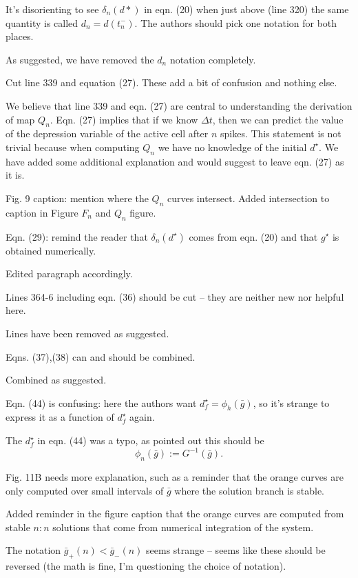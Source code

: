 \documentclass{ar2rc}
\begin{document}
\RC
It’s disorienting to see $\delta_n(d*)$ in eqn. (20) when just above (line 320) the same quantity is called $d_n = d(t_n^ -)$. The authors should pick one notation for both places.

\AR
As suggested, we have removed the $d_ n$ notation completely.

\RC
Cut line 339 and equation (27). These add a bit of confusion and nothing else.

\AR
We believe that line 339 and eqn. (27) are central to understanding the derivation of map $Q_{n}$. Eqn. (27) implies that if we know $\Delta t$, then we can predict the value of the depression variable of the active cell after $n$ spikes. This statement is not trivial because when computing $Q_{n}$ we have no knowledge of the initial $d^{\star}$. We have added some additional explanation and would suggest to leave eqn. (27) as it is.

\RC
Fig. 9 caption: mention where the $Q_n$ curves intersect.
\AR
Added intersection to caption in Figure $F_{n}$ and $Q_{n}$ figure.

\RC
Eqn. (29): remind the reader that $\delta_n(d^ \star)$ comes from eqn. (20) and that $g^{\star}$ is obtained numerically.

\AR
Edited paragraph accordingly.

\RC
Lines 364-6 including eqn. (36) should be cut – they are neither new nor helpful here.

\AR
Lines have been removed as suggested.

\RC
Eqns. (37),(38) can and should be combined.

\AR
Combined as suggested.

\RC
Eqn. (44) is confusing: here the authors want $d_f^\star = \phi_h(\bar{g})$, so it’s strange to express it as a function of $d_f^\star$ again.

\AR
The $d_{f}^{\star}$ in eqn. (44) was a typo, as pointed out this should be
\begin{equation}
    \phi_{n}(\bar g) := G^{-1}(\bar g).
\end{equation}

\RC
Fig. 11B needs more explanation, such as a reminder that the orange curves are only computed over small intervals of $\bar{g}$ where the solution branch is stable.

\AR
Added reminder in the figure caption that the orange curves are computed from stable $n:n$ solutions that come from numerical integration of the system.

\RC
The notation $\bar{g}_{+}(n) < \bar{g}_{-}(n)$ seems strange – seems like these should be reversed (the math is fine, I’m questioning the choice of notation).
\end{document}
